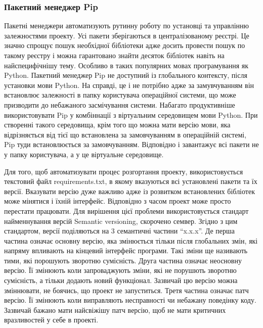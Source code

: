 \subsubsection{Пакетний менеджер Pip}
Пакетні менеджери автоматизують рутинну роботу по установці та управлінню
залежностями проекту. Усі пакети зберігаються в централізованому
реєстрі. Це значно спрощує пошук необхідної бібліотеки адже досить провести
пошук по такому реєстру і можна гарантовано знайти десяток бібліотек навіть
на найспецифічнішу тему. Особливо в таких популярних мовах програмування як
Python. Пакетний менеджер Pip не доступний із глобального контексту, після
установки мови Python. На справді, це і не потрібно адже за замувчуванням
він встановлює залежності в папку користувача операційної системи, що може
призводити до небажаного засмічування системи. Набагато продуктивніше
використовувати Pip у комбіннації з віртуальним середовищем мови Python.
При створенні такого середовища, крім того що можна мати версію мови, яка
відрізняється від тієї що встановлена за замовчуванням в операційній системі,
Pip туди встановлюється за замовчуванням. Відповідно і завантажує
всі пакети не у папку користувача, а у це віртуальне середовище.

Для того, щоб автоматизувати процес розгортання проекту, використовується
текстовий файл requirements.txt, в якому вказуються всі установлені пакети
та їх версії. Вказувати версію дуже важливо адже із розвитком встановлених
бібліотек може мінятися і їхній інтерфейс. Відповідно з часом проект може
просто перестати працювати. Для вирішення цієї проблеми використовується
стандарт найменнування версій Semantic versioning, скорочено семвер.
Згідно з цим стандартом, версії поділяються на 3 семантичні
частини ``x.x.x''. Де перша частина означає основну версію, яка змінюється
тільки після глобальних змін, які напряму впливають на кінцевий інтерфейс
програми. Такі зміни ще називають тими, які порошують зворотню сумісність.
Друга частина означає неосновну версію. Її змінюють коли запроваджують
зміни, які не порушють зворотню сумісність, а тільки додають новий функціонал.
Зазвичай цю версію можна зміннювати, не боячись, що проект не запуститься.
Третя частина означає патч версію. Її змінюють коли виправляють несправності
чи небажану поведінку коду. Зазвичай бажано мати найсвіжішу патч версію,
щоб не мати критичних вразливостей у себе в проекті.

